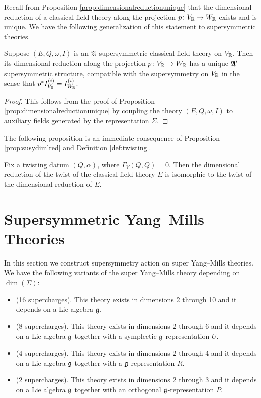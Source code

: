 \documentclass[10pt, oneside]{article}
\begin{document}
Recall from Proposition \ref{prop:dimensionalreductionunique} that the dimensional reduction of a classical field theory along the projection $p\colon V_\mathbb R\rightarrow W_\mathbb R$ exists and is unique. We have the following generalization of this statement to supersymmetric theories.

\begin{prop} \label{prop:susydimlred}
Suppose $(E, Q, \omega, I)$ is an $\mathfrak{A}$-supersymmetric classical field theory on $V_\mathbb R$. Then its dimensional reduction along the projection $p\colon V_\mathbb R\rightarrow W_\mathbb R$ has a unique $\mathfrak{A}'$-supersymmetric structure, compatible with the supersymmetry on $V_\mathbb R$ in the sense that $p^*I^{(i)}_{V_\mathbb R} = I^{(i)}_{W_\mathbb R}$.
\end{prop}

\begin{proof}
This follows from the proof of Proposition \ref{prop:dimensionalreductionunique} by coupling the theory $(E, Q, \omega, I)$ to auxiliary fields generated by the representation $\Sigma$.
\end{proof}

The following proposition is an immediate consequence of Proposition \ref{prop:susydimlred} and Definition \ref{def:twisting}.

\begin{prop}
Fix a twisting datum $(Q, \alpha)$, where $\Gamma_V(Q, Q) = 0$. Then the dimensional reduction of the twist of the classical field theory $E$ is isomorphic to the twist of the dimensional reduction of $E$.
\label{prop:twistdimensionalreduction}
\end{prop}

\section{Supersymmetric Yang--Mills Theories} \label{sect:SYM}

In this section we construct supersymmetry action on super Yang--Mills theories. We have the following variants of the super Yang--Mills theory depending on $\dim(\Sigma)$:
\begin{itemize}
\item (16 supercharges). This theory exists in dimensions 2 through 10 and it depends on a Lie algebra $\mathfrak g$.

\item (8 supercharges). This theory exists in dimensions 2 through 6 and it depends on a Lie algebra $\mathfrak g$ together with a symplectic $\mathfrak g$-representation $U$.

\item (4 supercharges). This theory exists in dimensions 2 through 4 and it depends on a Lie algebra $\mathfrak g$ together with a $\mathfrak g$-representation $R$.

\item (2 supercharges). This theory exists in dimensions 2 through 3 and it depends on a Lie algebra $\mathfrak g$ together with an orthogonal $\mathfrak g$-representation $P$.
\end{itemize}
\end{document}
